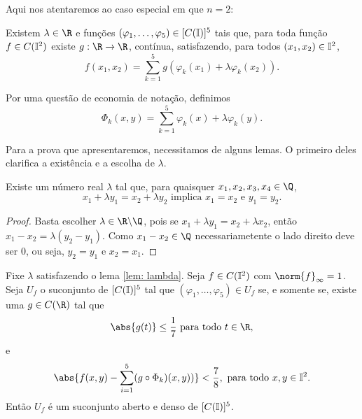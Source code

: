 Aqui nos atentaremos ao caso especial em que \( n = 2 \):
\begin{teo}
    Existem \( \lambda \in \R \) e funções \( ( \varphi_{ 1 }, \dots, \varphi_{ 5 } ) \in [C(\mathbb{I})]^{ 5 } \) tais que, para toda função \( f \in C(\mathbb{I}^{ 2 }) \) existe \( g : \R \to \R \), contínua, satisfazendo, para todos \( ( x_{ 1 }, x_{ 2 } ) \in \mathbb{I}^{ 2 } \), \[
        f ( x_{ 1 }, x_{ 2 } ) =
        \sum_{ k=1 }^{ 5 } g ( \varphi_{ k } ( x_{ 1 } ) + \lambda \varphi_{ k } ( x_{ 2 } ) )
    .\]
    \label{teo: hilbert13}
\end{teo}
\begin{rem}
    Por uma questão de economia de notação, definimos \[
        \Phi_{ k }(x, y) = \sum_{ k=1 }^{ 5 } \varphi_{ k } (x) + \lambda \varphi_{ k } (y)
    .\]
\end{rem}
Para a prova que apresentaremos, necessitamos de alguns lemas.
O primeiro deles clarifica a existência e a escolha de \( \lambda \).
\begin{lem}
    Existe um número real \( \lambda \) tal que, para quaisquer \( x_{ 1 }, x_{ 2 }, x_{ 3 }, x_{ 4 } \in \Q \), \[
        x_{ 1 } + \lambda y_{ 1 } = x_{ 2 } + \lambda y_{ 2 }
        \text{ implica }
        x_{ 1 } = x_{ 2 } \text{ e } y_{ 1 } = y_{ 2 }
    .\]
    \label{lem: lambda}
\end{lem}
\begin{proof}
    Basta escolher \( \lambda \in \R \backslash \Q \), pois se \( x_{ 1 } + \lambda y_{ 1 } = x_{ 2 } + \lambda x_{ 2 } \), então \( x_{ 1 } - x_{ 2 } = \lambda ( y_{ 2 } - y_{ 1 } ) \).
    Como \( x_{ 1 } - x_{ 2 } \in \Q \) necessariametente o lado direito deve ser \( 0 \), ou seja, \( y_{ 2 } = y_{ 1 } \) e \( x_{ 2 } = x_{ 1 } \).
\end{proof}
\begin{lem}
    Fixe \( \lambda \) satisfazendo o lema \ref{lem: lambda}.
    Seja \( f \in C(\mathbb{I}^2) \) com \( \norm{ f }_{ \infty } = 1 \).
    Seja \( U_{ f } \) o suconjunto de \( [C(\mathbb{I})]^{ 5 } \) tal que \( ( \varphi_{ 1 }, \dots, \varphi_{ 5 } ) \in U_{ f } \) se, e somente se, existe uma \( g \in C(\R) \) tal que
    \begin{equation}
        \abs{ g(t) } \leq \frac{ 1 }{ 7 } \text{ para todo } t \in \R
        \label{eq: g_bound}
    ,\end{equation}
    e
    \begin{equation}
        \abs{ 
            f(x, y)
            - \sum_{ i=1 }^{ 5 } (g \circ \Phi_{ k })(x, y) )
         }
         < \frac{ 7 }{ 8 }, \text{ para todo } x, y \in \I^2
         \label{eq: dif_bound}
    .\end{equation}
    Então \( U_{ f } \) é um suconjunto aberto e denso de \( [C(\mathbb{I})]^{ 5 } \).
    \label{lem: uf}
\end{lem}
